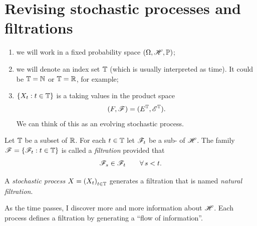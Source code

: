 \documentclass{report}
\begin{document}
\section{Revising stochastic processes and filtrations}
\begin{notation}
	\begin{enumerate}
		\item we will work in a fixed probability space $(\Omega,\mathscr{H},\mathbb{P})$;
		\item we will denote an index set $\mathbb{T}$ (which is usually interpreted as time). It could be $\mathbb{T}=\mathbb{N}$ or $\mathbb{T}=\mathbb{R}$, for example;
		\item $\{X_t:t\in \mathbb{T}\}$ is a \rv{} taking values in the product space
		\[(F,\mathscr{F})=(E^{\mathbb{T}},\mathscr{E}^{\mathbb{T}}).\]
		We can think of this as an evolving stochastic process.
	\end{enumerate}
\end{notation}
Let $\mathbb{T}$ be a subset of $\mathbb{R}$. For each $t\in\mathbb{T}$ let $\mathscr{F}_t$ be a sub-\sa{} of $\mathscr{H}$. The family $\mathscr{F}=\left\{\mathscr{F}_t:t\in\mathbb{T}\right\}$ is called a \emph{filtration} provided that
\[\mathscr{F}_s\in\mathscr{F}_t\qquad\forall\, s<t.\]
\begin{definition}
	A \emph{stochastic process} $X={(X_t)}_{t\in\mathbb{T}}$ generates a filtration that is named \emph{natural filtration}.
\end{definition}
As the time passes, I discover more and more information about $\mathscr{H}$. Each process defines a filtration by generating a ``flow of information''.
\end{document}

